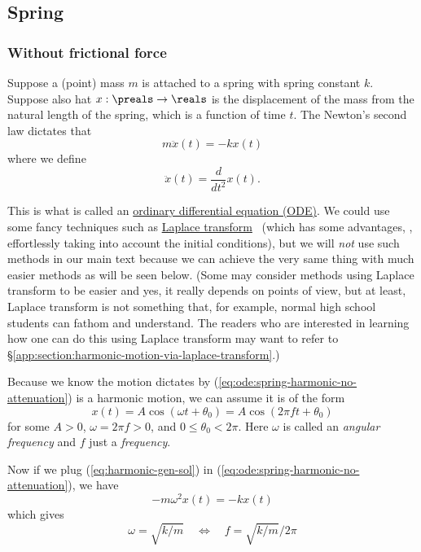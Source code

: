 \documentclass{article}
\begin{document}
\subsection{Spring}

\subsubsection{Without frictional force}

Suppose a (point) mass $m$ is attached to a spring with spring constant $k$.
Suppose also hat $x:\preals\to\reals$ is the displacement of the mass from the natural length of the spring,
which is a function of time $t$.
The Newton's second law dictates that
\begin{equation}
\label{eq:ode:spring-harmonic-no-attenuation}
	m \ddot{x}(t)
	=
	-kx(t)
\end{equation}
where we define
\[
	\ddot{x}(t) = \frac{d}{dt^2} x(t).
\]

This is what is called an \href{https://en.wikipedia.org/wiki/Ordinary_differential_equation}{ordinary differential equation (ODE)}.
We could use some fancy techniques such as \href{https://en.wikipedia.org/wiki/Laplace_transform}{Laplace transform}~\cite{Laplace-transform}
(which has some advantages, \eg, effortlessly taking into account the initial conditions),
but we will \emph{not} use such methods in our main text
because we can achieve the very same thing with much easier methods as will be seen below.
(Some may consider methods using Laplace transform to be easier and yes, it really depends on points of view,
but at least, Laplace transform is not something that, for example, normal high school students can fathom and understand.
The readers who are interested in learning how one can do this using Laplace transform
may want to refer to \S\ref{app:section:harmonic-motion-via-laplace-transform}.)

Because we know the motion dictates by (\ref{eq:ode:spring-harmonic-no-attenuation}) is a harmonic motion,
we can assume it is of the form
\begin{equation}
\label{eq:harmonic-gen-sol}
	x(t) = A \cos(\omega t + \theta_0)
	= A \cos(2\pi f t + \theta_0)
\end{equation}
for some $A>0$, $\omega=2\pi f >0$, and $0\leq \theta_0 <2\pi$.
Here $\omega$ is called an \emph{angular frequency}
and $f$ just a \emph{frequency}.

Now if we plug (\ref{eq:harmonic-gen-sol}) in (\ref{eq:ode:spring-harmonic-no-attenuation}),
we have
\[
-m \omega^2 x(t) = - k x(t)
\]
which gives
\begin{equation}
\label{eq:freq-sol}
\omega = \sqrt{k/m}
\quad
\Leftrightarrow
\quad
f = \sqrt{k/m} / 2\pi
\end{equation}
\end{document}
